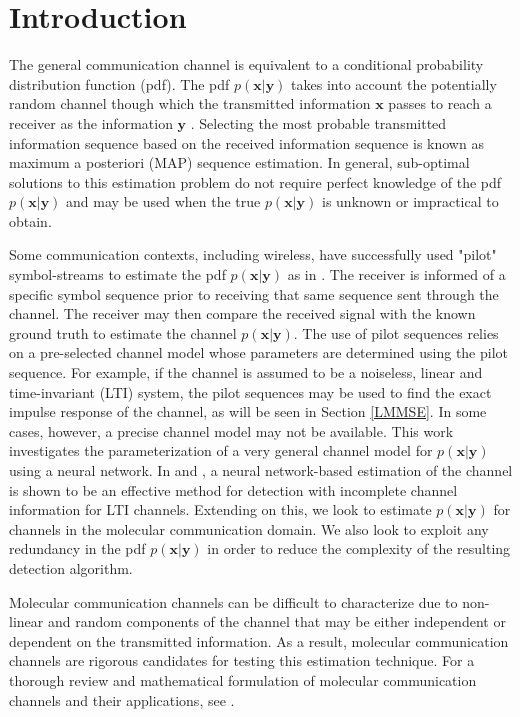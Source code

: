 \section{Introduction}

The general communication channel is equivalent to a conditional probability distribution function (pdf). The pdf $p(\mathbf{x}|\mathbf{y})$ takes into account the potentially random channel though which the transmitted information $\mathbf{x}$ passes to reach a receiver as the information $\mathbf{y}$ \cite[Ch.~7]{cover2012elements}. Selecting the most probable transmitted information sequence based on the received information sequence is known as maximum a posteriori (MAP) sequence estimation. In general, sub-optimal solutions to this estimation problem do not require perfect knowledge of the pdf $p(\mathbf{x}|\mathbf{y})$ and may be used when the true $p(\mathbf{x}|\mathbf{y})$ is unknown or impractical to obtain.

\par
Some communication contexts, including wireless, have successfully used "pilot" symbol-streams to estimate the pdf $p(\mathbf{x}|\mathbf{y})$ as in \cite{van1995channel}. The receiver is informed of a specific symbol sequence prior to receiving that same sequence sent through the channel. The receiver may then compare the received signal with the known ground truth to estimate the channel $p(\mathbf{x}|\mathbf{y})$.
The use of pilot sequences relies on a pre-selected channel model whose parameters are determined using the pilot sequence. For example, if the channel is assumed to be a noiseless, linear and time-invariant (LTI) system, the pilot sequences may be used to find the exact impulse response of the channel, as will be seen in Section \ref{LMMSE}. In some cases, however, a precise channel model may not be available. This work investigates the parameterization of a very general channel model for $p(\mathbf{x}|\mathbf{y})$ using a neural network. In \cite{shlezinger2019viterbinet} and \cite{shlezinger2020datadriven}, a neural network-based estimation of the channel is shown to be an effective method for detection with incomplete channel information for LTI channels.
 Extending on this, we look to estimate $p(\mathbf{x}|\mathbf{y})$ for channels in the molecular communication domain.
 We also look to exploit any redundancy in the pdf $p(\mathbf{x}|\mathbf{y})$ in order to reduce the complexity of the resulting detection algorithm.
\par
Molecular communication channels can be difficult to characterize due to non-linear and random components of the channel that may be either independent or dependent on the transmitted information. As a result, molecular communication channels are rigorous candidates for testing this estimation technique. For a thorough review and mathematical formulation of molecular communication channels and their applications, see \cite{jamali2019channel}. 

